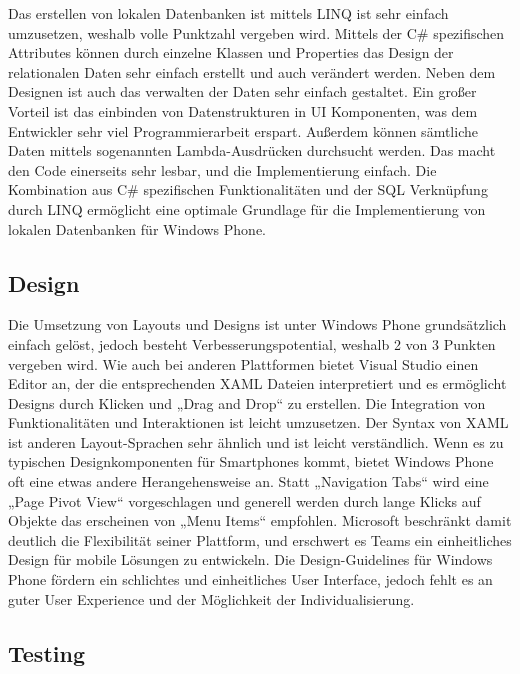 Das erstellen von lokalen Datenbanken ist mittels LINQ ist sehr einfach umzusetzen, weshalb volle Punktzahl vergeben wird. Mittels der C\# spezifischen Attributes können durch einzelne Klassen und Properties das Design der relationalen Daten sehr einfach erstellt und auch verändert werden. Neben dem Designen ist auch das verwalten der Daten sehr einfach gestaltet. Ein großer Vorteil ist das einbinden von Datenstrukturen in UI Komponenten, was dem Entwickler sehr viel Programmierarbeit erspart. Außerdem können sämtliche Daten mittels sogenannten Lambda-Ausdrücken durchsucht werden. Das macht den Code einerseits sehr lesbar, und die Implementierung einfach. Die Kombination aus C\# spezifischen Funktionalitäten und der SQL Verknüpfung durch LINQ ermöglicht eine optimale Grundlage für die Implementierung von lokalen Datenbanken für Windows Phone. 

\subsection{Design}

Die Umsetzung von Layouts und Designs ist unter Windows Phone grundsätzlich einfach gelöst, jedoch besteht Verbesserungspotential, weshalb 2 von 3 Punkten vergeben wird. Wie auch bei anderen Plattformen bietet Visual Studio einen Editor an, der die entsprechenden XAML Dateien interpretiert und es ermöglicht Designs durch Klicken und „Drag and Drop“ zu erstellen. Die Integration von Funktionalitäten und Interaktionen ist leicht umzusetzen. Der Syntax von XAML ist anderen Layout-Sprachen sehr ähnlich und ist leicht verständlich. Wenn es zu typischen Designkomponenten für Smartphones kommt, bietet Windows Phone oft eine etwas andere Herangehensweise an. Statt „Navigation Tabs“ wird eine „Page Pivot View“ vorgeschlagen und generell werden durch lange Klicks auf Objekte das erscheinen von „Menu Items“ empfohlen. Microsoft beschränkt damit deutlich die Flexibilität seiner Plattform, und erschwert es Teams ein einheitliches Design für mobile Lösungen zu entwickeln. Die Design-Guidelines für Windows Phone fördern ein schlichtes und einheitliches User Interface, jedoch fehlt es an guter User Experience und der Möglichkeit der Individualisierung.

\subsection{Testing}

